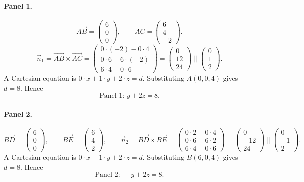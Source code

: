 \documentclass[11pt]{article}
\begin{document}
\paragraph{Panel 1.}
\[
\overrightarrow{AB} = \begin{pmatrix} 6 \\ 0 \\ 0 \end{pmatrix},\qquad
\overrightarrow{AC} = \begin{pmatrix} 6 \\ 4 \\ -2 \end{pmatrix}.
\]
\[
\vec{n}_1 = \overrightarrow{AB} \times \overrightarrow{AC}
= \begin{pmatrix}
0\cdot(-2) - 0\cdot4 \\
0\cdot6 - 6\cdot(-2) \\
6\cdot4 - 0\cdot6
\end{pmatrix}
= \begin{pmatrix} 0 \\ 12 \\ 24 \end{pmatrix}
\parallel \begin{pmatrix} 0 \\ 1 \\ 2 \end{pmatrix}.
\]
A Cartesian equation is $0\cdot x + 1\cdot y + 2\cdot z = d$. Substituting $A(0,0,4)$ gives $d = 8$. Hence
\[
\boxed{\text{Panel 1: } y + 2z = 8.}
\]

\paragraph{Panel 2.}
\[
\overrightarrow{BD} = \begin{pmatrix} 6 \\ 0 \\ 0 \end{pmatrix},\qquad
\overrightarrow{BE} = \begin{pmatrix} 6 \\ 4 \\ 2 \end{pmatrix},\qquad
\vec{n}_2 = \overrightarrow{BD} \times \overrightarrow{BE}
= \begin{pmatrix}
0\cdot2 - 0\cdot4 \\
0\cdot6 - 6\cdot2 \\
6\cdot4 - 0\cdot6
\end{pmatrix}
= \begin{pmatrix} 0 \\ -12 \\ 24 \end{pmatrix}
\parallel \begin{pmatrix} 0 \\ -1 \\ 2 \end{pmatrix}.
\]
A Cartesian equation is $0\cdot x - 1\cdot y + 2\cdot z = d$. Substituting $B(6,0,4)$ gives $d = 8$. Hence
\[
\boxed{\text{Panel 2: } -y + 2z = 8.}
\]
\end{document}
